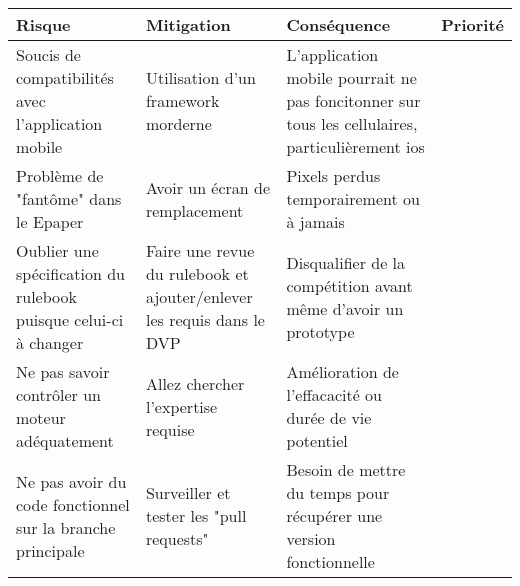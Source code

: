 \begin{tabularx}{\linewidth}{
    |>{\hsize=0.40\hsize}X|%
    >{\hsize=0.25\hsize}X|%
    >{\hsize=0.25\hsize}X|%
    >{\hsize=0.1\hsize}X|%
  }
    \hline
    \textbf{Risque} & \textbf{Mitigation} & \textbf{Conséquence} & \textbf{Priorité}\\\hline
    Soucis de compatibilités avec l'application mobile & Utilisation d'un framework morderne & L'application mobile pourrait ne pas foncitonner sur tous les cellulaires, particulièrement ios & 4 \\\hline %
    Problème de "fantôme" dans le Epaper & Avoir un écran de remplacement & Pixels perdus temporairement ou à jamais & 1 \\\hline %
    Oublier une spécification du rulebook puisque celui-ci à changer & Faire une revue du rulebook et ajouter/enlever les requis dans le DVP & Disqualifier de la compétition avant même d'avoir un prototype & 1\\\hline
    
    Ne pas savoir contrôler un moteur adéquatement & Allez chercher l'expertise requise & Amélioration de l'effacacité ou durée de vie potentiel & 4 \\\hline
    Ne pas avoir du code fonctionnel sur la branche principale & Surveiller et tester les "pull requests" & Besoin de mettre du temps pour récupérer une version fonctionnelle & 2 \\\hline
  \end{tabularx}
  
  

  
